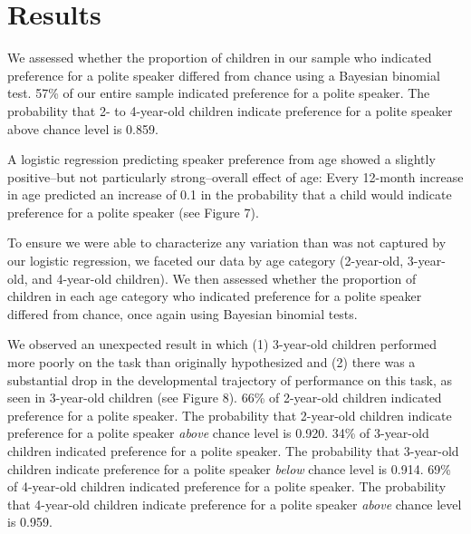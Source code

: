 \documentclass[
  english,
  man,floatsintext]{apa6}
\begin{document}
\hypertarget{results}{%
\section{Results}\label{results}}

We assessed whether the proportion of children in our sample who indicated preference for a polite speaker differed from chance using a Bayesian binomial test. 57\% of our entire sample indicated preference for a polite speaker. The probability that 2- to 4-year-old children indicate preference for a polite speaker above chance level is 0.859.

A logistic regression predicting speaker preference from age showed a slightly positive--but not particularly strong--overall effect of age: Every 12-month increase in age predicted an increase of 0.1 in the probability that a child would indicate preference for a polite speaker (see Figure 7).

To ensure we were able to characterize any variation than was not captured by our logistic regression, we faceted our data by age category (2-year-old, 3-year-old, and 4-year-old children). We then assessed whether the proportion of children in each age category who indicated preference for a polite speaker differed from chance, once again using Bayesian binomial tests.

We observed an unexpected result in which (1) 3-year-old children performed more poorly on the task than originally hypothesized and (2) there was a substantial drop in the developmental trajectory of performance on this task, as seen in 3-year-old children (see Figure 8). 66\% of 2-year-old children indicated preference for a polite speaker. The probability that 2-year-old children indicate preference for a polite speaker \emph{above} chance level is 0.920. 34\% of 3-year-old children indicated preference for a polite speaker. The probability that 3-year-old children indicate preference for a polite speaker \emph{below} chance level is 0.914. 69\% of 4-year-old children indicated preference for a polite speaker. The probability that 4-year-old children indicate preference for a polite speaker \emph{above} chance level is 0.959.
\end{document}
